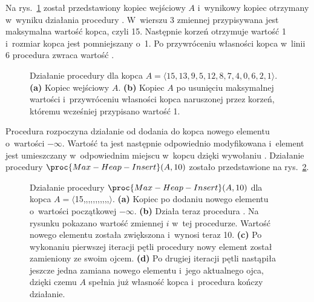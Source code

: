 
\exercise %
Na rys.\ \ref{fig:6.5-1} został przedstawiony kopiec wejściowy $A$ i~wynikowy kopiec otrzymany w~wyniku działania procedury .
W~wierszu 3 zmiennej  przypisywana jest maksymalna wartość kopca, czyli 15.
Następnie korzeń otrzymuje wartość 1 i~rozmiar kopca jest pomniejszany o~1.
Po przywróceniu własności kopca w~linii 6 procedura zwraca wartość .
\begin{figure}[!ht]
	\centering 
	\caption{Działanie procedury  dla kopca $A=\langle15,13,9,5,12,8,7,4,0,6,2,1\rangle$.
{\sffamily\bfseries(a)} Kopiec wejściowy $A$.
{\sffamily\bfseries(b)} Kopiec $A$ po usunięciu maksymalnej wartości i~przywróceniu własności kopca naruszonej przez korzeń, któremu wcześniej przypisano wartość 1.} \label{fig:6.5-1}
\end{figure}

\exercise %
Procedura  rozpoczyna działanie od dodania do kopca nowego elementu o~wartości $-\infty$.
Wartość ta jest następnie odpowiednio modyfikowana i~element jest umieszczany w~odpowiednim miejscu w~kopcu dzięki wywołaniu .
Działanie procedury $\proc{Max-Heap-Insert}(A,10)$ zostało przedstawione na rys.\ \ref{fig:6.5-2}.
\begin{figure}[!ht]
	\centering 
	\caption{Działanie procedury $\proc{Max-Heap-Insert}(A,10)$ dla kopca $A=\langle$15,,,,,,,,,,,$\rangle$.
{\sffamily\bfseries(a)} Kopiec po dodaniu nowego elementu o~wartości początkowej $-\infty$.
{\sffamily\bfseries(b)} Działa teraz procedura .
Na rysunku pokazano wartość zmiennej $i$ w~tej procedurze.
Wartość nowego elementu została zwiększona i~wynosi teraz 10.
{\sffamily\bfseries(c)} Po wykonaniu pierwszej iteracji pętli  procedury  nowy element został zamieniony ze swoim ojcem.
{\sffamily\bfseries(d)} Po drugiej iteracji pętli nastąpiła jeszcze jedna zamiana nowego elementu i~jego aktualnego ojca, dzięki czemu $A$ spełnia już własność kopca i~procedura kończy działanie.} \label{fig:6.5-2}
\end{figure}

